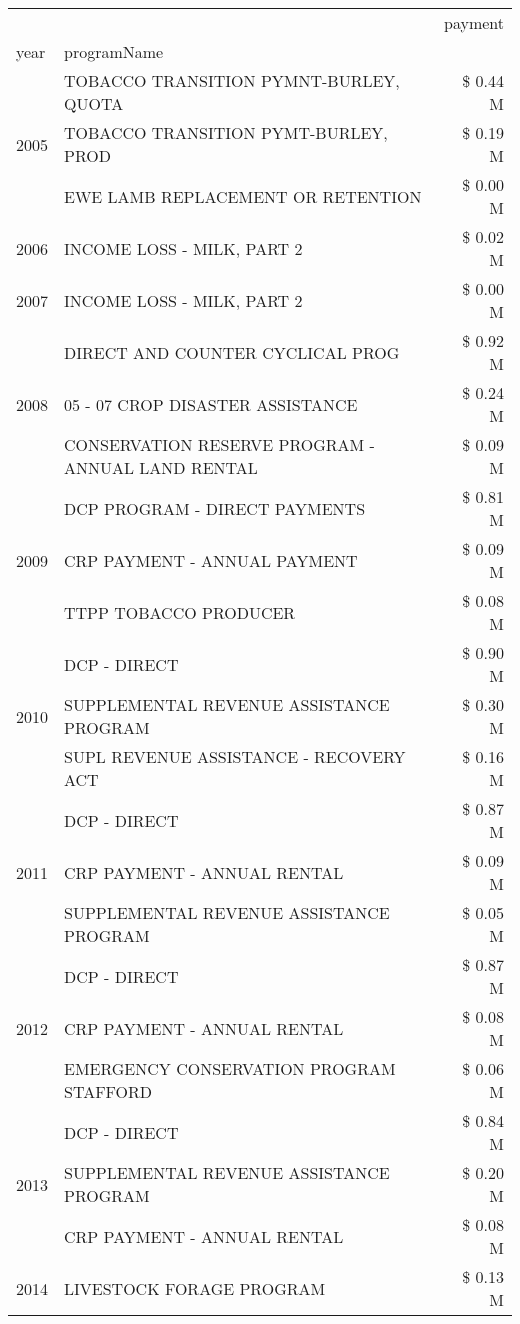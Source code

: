 \begin{tabular}{llr}
\toprule
 &  & payment \\
year & programName &  \\
\midrule
\multirow[t]{3}{*}{2005} & TOBACCO TRANSITION PYMNT-BURLEY, QUOTA & \$ 0.44 M \\
 & TOBACCO TRANSITION PYMT-BURLEY, PROD & \$ 0.19 M \\
 & EWE LAMB REPLACEMENT OR RETENTION & \$ 0.00 M \\
\cline{1-3}
2006 & INCOME LOSS - MILK, PART 2 & \$ 0.02 M \\
\cline{1-3}
2007 & INCOME LOSS - MILK, PART 2 & \$ 0.00 M \\
\cline{1-3}
\multirow[t]{3}{*}{2008} & DIRECT AND COUNTER CYCLICAL PROG & \$ 0.92 M \\
 & 05 - 07 CROP DISASTER ASSISTANCE & \$ 0.24 M \\
 & CONSERVATION RESERVE PROGRAM - ANNUAL LAND RENTAL & \$ 0.09 M \\
\cline{1-3}
\multirow[t]{3}{*}{2009} & DCP PROGRAM - DIRECT PAYMENTS & \$ 0.81 M \\
 & CRP PAYMENT - ANNUAL PAYMENT & \$ 0.09 M \\
 & TTPP TOBACCO PRODUCER & \$ 0.08 M \\
\cline{1-3}
\multirow[t]{3}{*}{2010} & DCP - DIRECT & \$ 0.90 M \\
 & SUPPLEMENTAL REVENUE ASSISTANCE PROGRAM & \$ 0.30 M \\
 & SUPL REVENUE ASSISTANCE - RECOVERY ACT & \$ 0.16 M \\
\cline{1-3}
\multirow[t]{3}{*}{2011} & DCP - DIRECT & \$ 0.87 M \\
 & CRP PAYMENT - ANNUAL RENTAL & \$ 0.09 M \\
 & SUPPLEMENTAL REVENUE ASSISTANCE PROGRAM & \$ 0.05 M \\
\cline{1-3}
\multirow[t]{3}{*}{2012} & DCP - DIRECT & \$ 0.87 M \\
 & CRP PAYMENT - ANNUAL RENTAL & \$ 0.08 M \\
 & EMERGENCY CONSERVATION PROGRAM STAFFORD & \$ 0.06 M \\
\cline{1-3}
\multirow[t]{3}{*}{2013} & DCP - DIRECT & \$ 0.84 M \\
 & SUPPLEMENTAL REVENUE ASSISTANCE PROGRAM & \$ 0.20 M \\
 & CRP PAYMENT - ANNUAL RENTAL & \$ 0.08 M \\
\cline{1-3}
\multirow[t]{3}{*}{2014} & LIVESTOCK FORAGE PROGRAM & \$ 0.13 M \\

\end{tabular}
